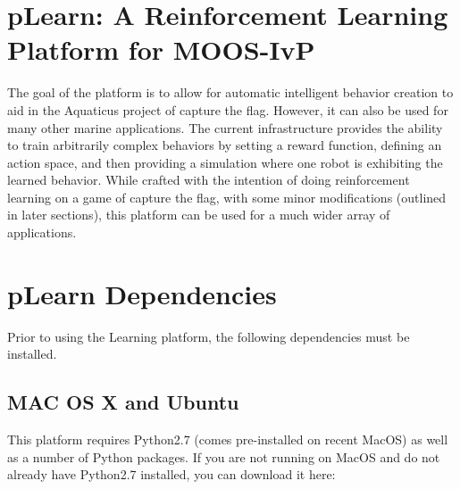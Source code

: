 \documentclass[onecolumn,letterpaper,11pt]{article}
\begin{document}
\begin{labcover}
\vspace{0.1in}
\vspace{0.1in}
\end{labcover}


\section{pLearn: A Reinforcement Learning Platform for MOOS-IvP}
\label{reinforcment}

The goal of the  platform is to allow for automatic intelligent behavior creation to aid in the Aquaticus project of capture the flag. However, it can also be used for many other marine applications. The current infrastructure provides the ability to train arbitrarily complex behaviors by setting a reward function, defining an action space, and then providing a simulation where one robot is exhibiting
the learned behavior. While crafted with the intention of doing reinforcement learning on a game of capture the flag, with some minor modifications (outlined in later sections), this platform can be used for a much wider array of applications.

\section{pLearn Dependencies}

Prior to using the  Learning platform, the following dependencies must be installed.

\subsection{MAC OS X and Ubuntu}

This platform requires Python2.7 (comes pre-installed on recent MacOS) as well
as a number of Python packages. If you are not running on MacOS and do not
already have Python2.7 installed, you can download it here:
\end{document}
